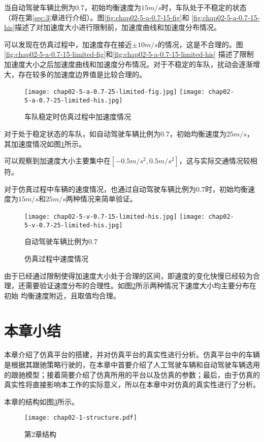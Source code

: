 当自动驾驶车辆比例为$0.7$，初始均衡速度为$15m/s$时，车队处于不稳定的状态（将在第\ref{sec:3}章进行介绍）。图\ref{fig:chap02-5-a-0.7-15-fig}和
\ref{fig:chap02-5-a-0.7-15-his}描述了对加速度大小进行限制前，加速度曲线和加速度分布情况。

可以发现在仿真过程中，加速度存在接近$\pm 10m/s$的情况，这是不合理的。图\ref{fig:chap02-5-a-0.7-15-limited-fig}和\ref{fig:chap02-5-a-0.7-15-limited-his}
描述了限制加速度大小之后加速度曲线和加速度分布情况。对于不稳定的车队，扰动会逐渐增大，存在较多的加速度边界值是比较合理的。

\begin{figure}
  \centering
    {\texttt{[image: chap02-5-a-0.7-25-limited-fig.jpg]}}
    {\texttt{[image: chap02-5-a-0.7-25-limited-his.jpg]}}
    \caption{车队稳定时仿真过程中加速度情况}
  \label{fig:chap02-6}
\end{figure}

对于处于稳定状态的车队，如自动驾驶车辆比例为$0.7$，初始均衡速度为$25m/s$，其加速度情况如图\ref{fig:chap02-6}所示。

可以观察到加速度大小主要集中在$[-0.5m/s^2, 0.5m/s^2]$，这与实际交通情况较相符。

对于仿真过程中车辆的速度情况，也通过自动驾驶车辆比例为$0.7$时，初始均衡速度为$15m/s$和$25m/s$两种情况来简单验证。

\begin{figure}
  \centering
    {\texttt{[image: chap02-5-v-0.7-15-limited-his.jpg]}}
    {\texttt{[image: chap02-5-v-0.7-25-limited-his.jpg]}}
  \caption*{自动驾驶车辆比例为$0.7$}
  \caption{仿真过程中速度情况}
  \label{fig:chap02-7}
\end{figure}

由于已经通过限制使得加速度大小处于合理的区间，即速度的变化快慢已经较为合理，还需要验证速度分布的合理性。如图\ref{fig:chap02-7}所示两种情况下速度大小均主要分布在初始
均衡速度附近，且取值均合理。

\section{本章小结}

本章介绍了仿真平台的搭建，并对仿真平台的真实性进行分析。仿真平台中的车辆是根据其跟驰策略行驶的，在本章中首要介绍了人工驾驶车辆和自动驾驶车辆选用
的跟驰模型；接着简要介绍了仿真所用的平台以及仿真的参数；最后，由于仿真的真实性将直接影响本工作的实际意义，所以在本章中对仿真的真实性进行了分析。

本章的结构如图\ref{fig:chap02-1-logic}所示。

\begin{figure}
  \centering
  \texttt{[image: chap02-1-structure.pdf]}
  \caption{第2章结构}
  \label{fig:chap02-1-logic}
\end{figure}